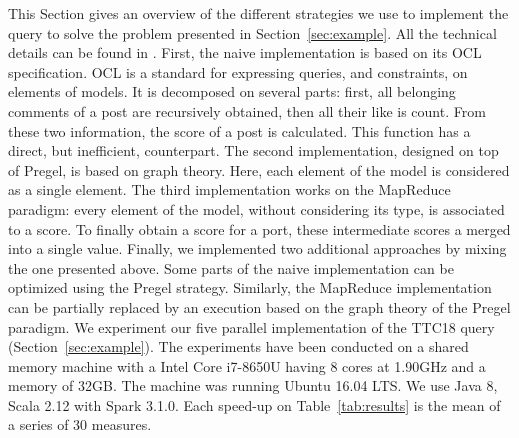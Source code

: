 \begin{multicols}{2}
This Section gives an overview of the different strategies we use to implement the query to solve
the problem presented in Section~\ref{sec:example}. All the technical details can be found in
\cite{PhilippeCTS2020:MODELS}. First, the naive implementation is based on its OCL specification.
OCL is a standard for expressing queries, and constraints, on elements of models. It is decomposed
on several parts: first, all belonging comments of a post are recursively obtained, then all their
like is count. From these two information, the score of a post is calculated. This function has a
direct, but inefficient, counterpart. The second implementation, designed on top of Pregel, is based
on graph theory. Here, each element of the model is considered as a single element. The third
implementation works on the MapReduce paradigm: every element of the model, without considering its
type, is associated to a score. To finally obtain a score for a port, these intermediate scores a
merged into a single value. Finally, we implemented two additional approaches by mixing the one 
presented above. Some parts of the naive implementation can be optimized using the Pregel strategy.
Similarly, the MapReduce implementation can be partially replaced by an execution based on the 
graph theory of the Pregel paradigm. We experiment our five parallel implementation of the TTC18 query
(Section~\ref{sec:example}). The experiments have been conducted on a shared memory machine with a 
Intel Core i7-8650U having 8 cores at 1.90GHz and a memory of 32GB. The machine was running Ubuntu
16.04 LTS. We use Java 8, Scala 2.12 with Spark 3.1.0. Each speed-up on Table~\ref{tab:results} is
the mean of a series of 30 measures.
\end{multicols}

